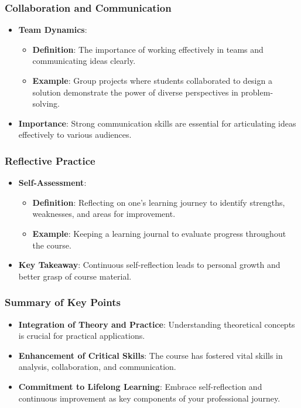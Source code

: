 \documentclass[aspectratio=169]{beamer}
\begin{document}
\begin{frame}[fragile]
    \frametitle{Collaboration and Communication}
    \begin{itemize}
        \item \textbf{Team Dynamics}:
        \begin{itemize}
            \item \textbf{Definition}: The importance of working effectively in teams and communicating ideas clearly.
            \item \textbf{Example}: Group projects where students collaborated to design a solution demonstrate the power of diverse perspectives in problem-solving.
        \end{itemize}
        \item \textbf{Importance}: Strong communication skills are essential for articulating ideas effectively to various audiences.
    \end{itemize}
\end{frame}

\begin{frame}[fragile]
    \frametitle{Reflective Practice}
    \begin{itemize}
        \item \textbf{Self-Assessment}:
        \begin{itemize}
            \item \textbf{Definition}: Reflecting on one's learning journey to identify strengths, weaknesses, and areas for improvement.
            \item \textbf{Example}: Keeping a learning journal to evaluate progress throughout the course.
        \end{itemize}
        \item \textbf{Key Takeaway}: Continuous self-reflection leads to personal growth and better grasp of course material.
    \end{itemize}
\end{frame}

\begin{frame}[fragile]
    \frametitle{Summary of Key Points}
    \begin{itemize}
        \item \textbf{Integration of Theory and Practice}: Understanding theoretical concepts is crucial for practical applications.
        \item \textbf{Enhancement of Critical Skills}: The course has fostered vital skills in analysis, collaboration, and communication.
        \item \textbf{Commitment to Lifelong Learning}: Embrace self-reflection and continuous improvement as key components of your professional journey.
    \end{itemize}
\end{frame}
\end{document}
